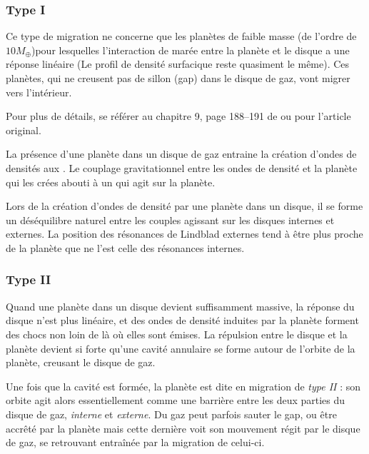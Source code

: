 \subsubsection{Type I}
Ce type de migration ne concerne que les planètes de faible masse (de l'ordre de $10M_{\oplus}$)pour lesquelles l'interaction de marée entre la planète et le disque a une réponse linéaire (Le profil de densité surfacique reste quasiment le même). Ces planètes, qui ne creusent pas de sillon (gap) dans le disque de gaz, vont migrer vers l'intérieur.

\begin{remarque}
Pour plus de détails, se référer au chapitre 9, page 188--191 de \cite{barnes2010formation} ou \cite{ward1997protoplanet} pour l'article original.
\end{remarque}

La présence d'une planète dans un disque de gaz entraine la création d'ondes de densités aux  \citep{goldreich1979excitation}. Le couplage gravitationnel entre les ondes de densité et la planète qui les crées abouti à un  qui agit sur la planète.

Lors de la création d'ondes de densité par une planète dans un disque, il se forme un déséquilibre naturel entre les couples agissant sur les disques internes et externes. La position des résonances de Lindblad externes tend à être plus proche de la planète que ne l'est celle des résonances internes.


\subsubsection{Type II}
Quand une planète dans un disque devient suffisamment massive, la réponse du disque n'est plus linéaire, et des ondes de densité induites par la planète forment des chocs non loin de là où elles sont émises. La répulsion entre le disque et la planète devient si forte qu'une cavité annulaire se forme autour de l'orbite de la planète, creusant le disque de gaz.

Une fois que la cavité est formée, la planète est dite en migration de \emph{type II} : son orbite agit alors essentiellement comme une barrière entre les deux parties du disque de gaz, \emph{interne} et \emph{externe}. Du gaz peut parfois sauter le gap, ou être accrêté par la planète mais cette dernière voit son mouvement régit par le disque de gaz, se retrouvant entraînée par la migration de celui-ci.

